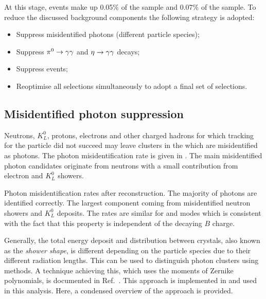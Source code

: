 At this stage, \BtoXsgamma events make up 0.05\% of the \feiBp sample and 0.07\% of the \feiBz sample.
To reduce the discussed background components the following strategy is adopted:
\begin{itemize}
    \item Suppress misidentified photons (different particle species);
    \item Suppress $\pi^0\rightarrow\gamma\gamma$ and $\eta\rightarrow\gamma\gamma$ decays;
    \item Suppress \epem\ra\qqbar events;
    \item Reoptimise all selections simultaneously to adopt a final set of selections.
\end{itemize}

\subsection{Misidentified photon suppression}\label{sec:selection_clusZMVA}

Neutrons, $K_L^0$, protons, electrons and other charged hadrons for which tracking for the particle did not succeed may leave clusters in the \ECL which are misidentified as photons.
The photon misidentification rate is given in .
The main misidentified photon candidates originate from neutrons with a small contribution from electron and $K_L^0$ showers.

\begin{table}[htbp!]
    \centering
    \caption{\label{tab:misidentified_photons} Photon misidentification rates after reconstruction.
    The majority of photons are identified correctly. The largest component coming from misidentified neutron showers and $K_L^0$ deposits.
    The rates are similar for \feiBp and \feiBz modes which is consistent with the fact that this property is independent of the decaying $B$ charge.}
    
\end{table}

Generally, the total energy deposit and distribution between \ECL crystals, also known as the \textit{shower shape}, is different depending on the particle species due to their different radiation lengths.
This can be used to distinguish photon clusters using \MVA methods.
A technique achieving this, which uses the moments of Zernike polynomials, is documented in Ref.~\cite{Hershenhorn:2468}.
This approach is implemented in \basftwo and used in this analysis.
Here, a condensed overview of the approach is provided.

